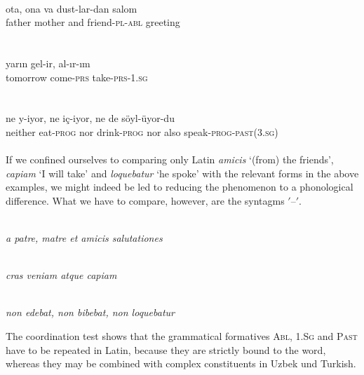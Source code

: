 \ea\label{ex:E109}
\langinfo{\LangUzb}{}{} \\
\gll ota,  ona  va  dust-lar-dan  salom\\
father  mother  and  friend-\textsc{pl}-\textsc{abl}  greeting\\
\\
\z
\noindent \ea\label{ex:E110}
\langinfo{\LangTurk}{}{} \\
\gll yarın  gel-ir,  al-ır-ım\\
tomorrow  come-\textsc{prs}  take-\textsc{prs}-1.\textsc{sg}\\
\\
\z
\noindent \ea\label{ex:E111}
\langinfo{\LangTurk}{}{}\\
\gll ne  y-iyor,  ne  iç-iyor,  ne  de  söyl-üyor-du\\
 neither  eat-\textsc{prog}  nor  drink-\textsc{prog}  nor  also  speak-\textsc{prog}-\textsc{past}(3.\textsc{sg})\\
\\
\z
\noindent If we confined ourselves to comparing only Latin \textit{amicis} ‘(from) the friends’, \textit{capiam} ‘I will take’ and \textit{loquebatur} ‘he spoke’ with the relevant forms in the above examples, we might indeed be led to reducing the phenomenon to a phonological difference. What we have to compare, however, are the syntagms $'$--$'$.

\begin{exe}
\\
\itshape a patre, matre et amicis salutationes\\
\end{exe}

\begin{exe}
\\
\itshape cras veniam atque capiam\\
\end{exe}

\begin{exe}
\\
\itshape non edebat, non bibebat, non loquebatur
\end{exe}

\noindent The coordination test shows that the grammatical formatives \textsc{Abl}, 1.\textsc{Sg} and \textsc{Past} have to be repeated in Latin, because they are strictly bound to the word, whereas they may be combined with complex constituents in Uzbek und Turkish.

